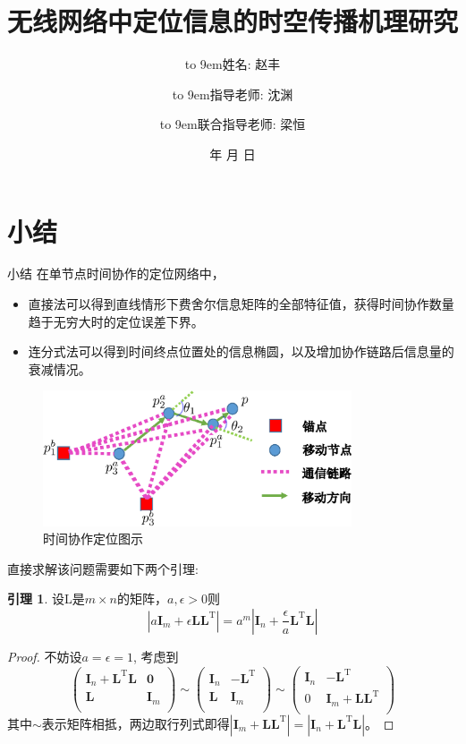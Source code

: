 \documentclass[notheorems,xetex]{beamer}
\title{无线网络中定位信息的时空传播机理研究} %
\author[赵丰]
{\quad \hbox to 9em{姓名: \hfil 赵丰}\\ \and \hbox to 9em{指导老师: \hfil 沈渊}\\ \and \hbox to 9em{联合指导老师: \hfil 梁恒}}
\institute[清华大学] %
{\normalsize\quad
  清华大学数学科学系
}
\date{\the\year 年 \the\month 月 \the\day 日}
\theoremstyle{definition}
\newtheorem{lemma}{引理}
\begin{document}
\frame{\titlepage}
\date{\hspace{1mm} \timemark}


\section{小结}
\begin{frame}{小结}
在单节点时间协作的定位网络中，
\begin{itemize}
\item 直接法可以得到直线情形下费舍尔信息矩阵的全部特征值，获得时间协作数量趋于无穷大时的定位误差下界。
\item 连分式法可以得到时间终点位置处的信息椭圆，以及增加协作链路后信息量的衰减情况。
\end{itemize}
     \begin{figure}
          \centering
          \includegraphics[height=4cm]{cooperative_single_temporal.eps}
          \caption*{时间协作定位图示}
     \end{figure}
\end{frame}
\appendix
\begin{frame}[noframenumbering]
直接求解该问题需要如下两个引理:
\begin{lemma}\label{lemma:change}
设L是$m\times n$的矩阵，$a,\epsilon > 0$则
\begin{equation*}
|a\bm{I}_m+\epsilon \bm{L}\bm{L}^{\textrm{T}}|=a^m|\bm{I}_n+\frac{\epsilon}{a} \bm{L}^{\textrm{T}}\bm{L}|
\end{equation*}
\end{lemma}
\begin{proof}
不妨设$a=\epsilon=1$,
考虑到
\[
\left(\begin{array}{cc}
\bm{I}_n+\bm{L}^{\textrm{T}}\bm{L}&\bm{0}\\
\bm{L}&\bm{I}_m\\
\end{array}\right)\sim\left(\begin{array}{cc}
\bm{I}_n&-\bm{L}^{\textrm{T}}\\
\bm{L}&\bm{I}_m\\
\end{array}\right)\sim\left(\begin{array}{cc}
\bm{I}_n&-\bm{L}^{\textrm{T}}\\
0&\bm{I}_m+\bm{L}\bm{L}^{\textrm{T}}\\
\end{array}\right)
\]
其中$\sim$表示矩阵相抵，两边取行列式即得$|\bm{I}_m+\bm{L}\bm{L}^{\textrm{T}}|=|\bm{I}_n+\bm{L}^{\textrm{T}}\bm{L}|$。
\end{proof}
\end{frame}
\end{document}
